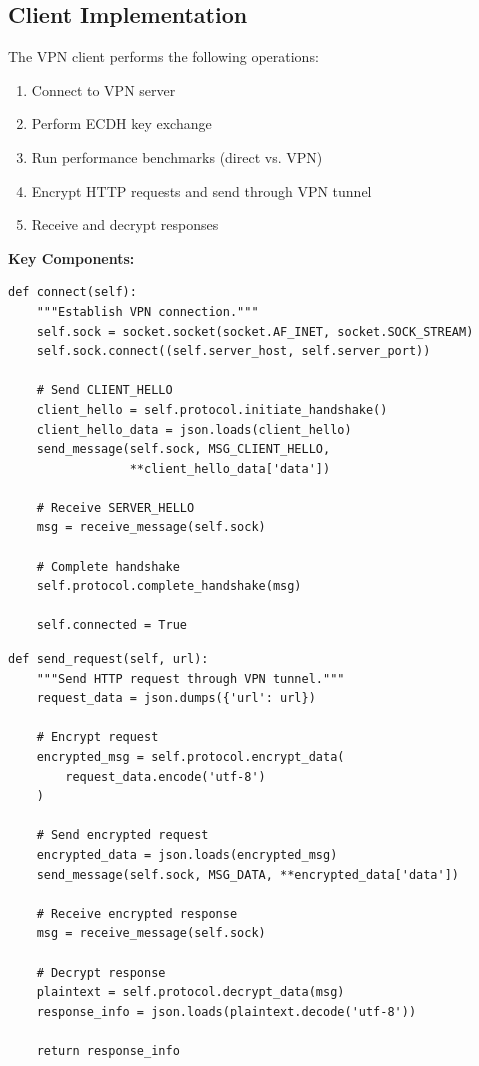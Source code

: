 \documentclass[12pt,a4paper]{article}
\begin{document}
\subsection{Client Implementation}

The VPN client performs the following operations:

\begin{enumerate}
    \item Connect to VPN server
    \item Perform ECDH key exchange
    \item Run performance benchmarks (direct vs. VPN)
    \item Encrypt HTTP requests and send through VPN tunnel
    \item Receive and decrypt responses
\end{enumerate}

\textbf{Key Components:}

\begin{lstlisting}[style=pythonstyle, caption={Client connection and handshake}]
def connect(self):
    """Establish VPN connection."""
    self.sock = socket.socket(socket.AF_INET, socket.SOCK_STREAM)
    self.sock.connect((self.server_host, self.server_port))
    
    # Send CLIENT_HELLO
    client_hello = self.protocol.initiate_handshake()
    client_hello_data = json.loads(client_hello)
    send_message(self.sock, MSG_CLIENT_HELLO, 
                 **client_hello_data['data'])
    
    # Receive SERVER_HELLO
    msg = receive_message(self.sock)
    
    # Complete handshake
    self.protocol.complete_handshake(msg)
    
    self.connected = True
\end{lstlisting}

\begin{lstlisting}[style=pythonstyle, caption={Sending requests through VPN}]
def send_request(self, url):
    """Send HTTP request through VPN tunnel."""
    request_data = json.dumps({'url': url})
    
    # Encrypt request
    encrypted_msg = self.protocol.encrypt_data(
        request_data.encode('utf-8')
    )
    
    # Send encrypted request
    encrypted_data = json.loads(encrypted_msg)
    send_message(self.sock, MSG_DATA, **encrypted_data['data'])
    
    # Receive encrypted response
    msg = receive_message(self.sock)
    
    # Decrypt response
    plaintext = self.protocol.decrypt_data(msg)
    response_info = json.loads(plaintext.decode('utf-8'))
    
    return response_info
\end{lstlisting}
\end{document}
